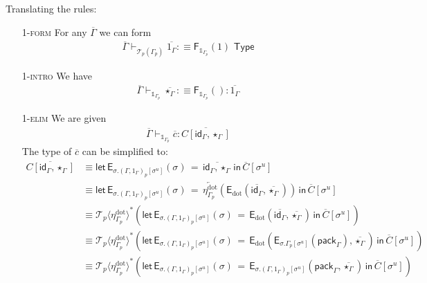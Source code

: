 \documentclass[10pt]{article}
\theoremstyle{definition}
\newcommand{\yields}{\vdash}
\newcommand{\TYPE}{\,\,\mathsf{Type}}
\newcommand{\id}{\mathsf{id}}
\newcommand{\rewrite}[2]{\overleftarrow{#1}(#2)}
\newcommand\F[2]{\ensuremath{\mathsf{F}_{#1}(#2)}}
\newcommand\St[2]{\ensuremath{{#1}^*(#2)}}
\newcommand\FIs[2]{\ensuremath{\mathsf{F}_{#1}{(#2)}}}
\newcommand\EEs[4]{\ensuremath{\mathsf{let} \, \mathsf{E}_{#1}(#3) \, = \, {#2} \, \mathsf{in} \, #4}}
\newcommand\EIs[2]{\ensuremath{\mathsf{E}_{#1}{(#2)}}}
\newcommand\El[2]{\mathcal{T}_{#1}(#2)}
\newcommand\ApEl[2]{\mathcal{T}_{#1}\langle#2\rangle}
\newcommand\pack[1]{\ensuremath{\mathsf{pack}_{#1}}}
\newcommand\unp[2]{\ensuremath{{#2}^u}}
\newcommand{\modeof}[1]{{#1}_p}
\newcommand{\sdot}{\ensuremath{\mathrm{dot}}}
\newcommand{\upstairs}[1]{\overline{#1}}
\newcommand\One{\ensuremath{\mathds{1}}}
\begin{document}
Translating the rules:
\begin{enumerate}[style = multiline, labelwidth = 80pt]
\item[\textsc{1-form}] For any $\upstairs{\Gamma}$ we can form
\begin{align*}
\upstairs{\Gamma} \yields_{\El{p}{\modeof{\Gamma}}} \upstairs{1_\Gamma} :\equiv \F{\One_{\modeof{\Gamma}}}{1} \TYPE
\end{align*}

\item[\textsc{1-intro}] We have
\begin{align*}
\upstairs{\Gamma} \yields_{\One_{\modeof{\Gamma}}} \upstairs{\star_\Gamma} :\equiv \FIs{\One_{\modeof{\Gamma}}}{} : \upstairs{1_\Gamma}
\end{align*}

\item[\textsc{1-elim}] We are given
\begin{align*}
\upstairs{\Gamma} \yields_{\One_{\modeof{\Gamma}}} \upstairs{c} : \upstairs{C[\id_\Gamma, \star_\Gamma]} 
\end{align*}
The type of $\upstairs{c}$ can be simplified to:
\begin{align*}
\upstairs{C[\id_\Gamma, \star_\Gamma]} 
&\equiv \EEs{\sigma.\modeof{(\Gamma, 1_\Gamma)}[\unp{\Gamma, 1_\Gamma}{\sigma}]}{\upstairs{\id_\Gamma, \star_\Gamma}}{\sigma}{\upstairs{C}[\unp{\Gamma, 1_\Gamma}{\sigma}]} \\
&\equiv \EEs{\sigma.\modeof{(\Gamma, 1_\Gamma)}[\unp{\Gamma, 1_\Gamma}{\sigma}]}{\rewrite{\eta^\sdot_{\modeof{\Gamma}}}{\EIs{\sdot}{\upstairs{\id_\Gamma}, \upstairs{\star_\Gamma}}}}{\sigma}{\upstairs{C}[\unp{\Gamma, 1_\Gamma}{\sigma}]} \\
&\equiv \St{\ApEl{p}{\eta^\sdot_{\modeof{\Gamma}}}}{\EEs{\sigma.\modeof{(\Gamma, 1_\Gamma)}[\unp{\Gamma, 1_\Gamma}{\sigma}]}{\EIs{\sdot}{\upstairs{\id_\Gamma}, \upstairs{\star_\Gamma}}}{\sigma}{\upstairs{C}[\unp{\Gamma, 1_\Gamma}{\sigma}]}} \\
&\equiv \St{\ApEl{p}{\eta^\sdot_{\modeof{\Gamma}}}}{\EEs{\sigma.\modeof{(\Gamma, 1_\Gamma)}[\unp{\Gamma, 1_\Gamma}{\sigma}]}{\EIs{\sdot}{\EIs{\sigma.\modeof{\Gamma}[\unp{\Gamma}{\sigma}]}{\pack{\Gamma}}, \upstairs{\star_\Gamma}}}{\sigma}{\upstairs{C}[\unp{\Gamma, 1_\Gamma}{\sigma}]}} \\
&\equiv \St{\ApEl{p}{\eta^\sdot_{\modeof{\Gamma}}}}{\EEs{\sigma.\modeof{(\Gamma, 1_\Gamma)}[\unp{\Gamma, 1_\Gamma}{\sigma}]}{\EIs{\sigma.\modeof{(\Gamma, 1_\Gamma)}[\unp{\Gamma, 1_\Gamma}{\sigma}]}{\pack{\Gamma}, \upstairs{\star_\Gamma}}}{\sigma}{\upstairs{C}[\unp{\Gamma, 1_\Gamma}{\sigma}]}} \\

\end{align*}
\end{enumerate}
\end{document}
